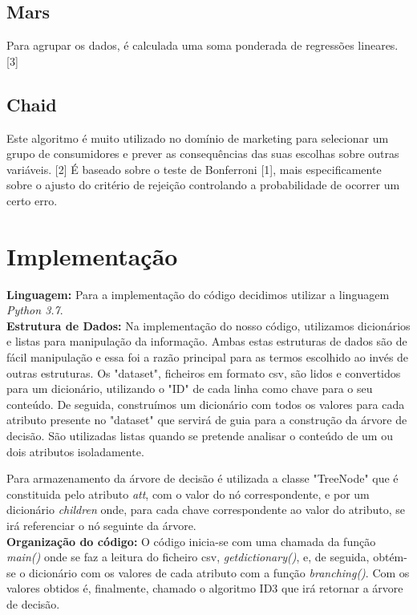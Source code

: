 \documentclass{article}
\begin{document}
\subsection{Mars}
\hspace{10mm}Para agrupar os dados, é calculada uma soma ponderada de regressões lineares. [3]
\subsection{Chaid}
\hspace{10mm}Este algoritmo é muito utilizado no domínio de marketing para selecionar um grupo de consumidores e prever as consequências das suas escolhas sobre outras variáveis. [2]
É baseado sobre o teste de Bonferroni [1], mais especificamente sobre o ajusto do critério de rejeição controlando a probabilidade de ocorrer um certo erro.
\newpage
\section{Implementação}
\textbf{Linguagem:} Para a implementação do código decidimos utilizar a linguagem \textit{Python 3.7}.\\[2mm]
\textbf{Estrutura de Dados:} Na implementação do nosso código, utilizamos dicionários e listas para manipulação da informação. Ambas estas estruturas de dados são de fácil manipulação e essa foi a razão principal para as termos escolhido ao invés de outras estruturas. Os "dataset", ficheiros em formato csv, são lidos e convertidos para um dicionário, utilizando o "ID" de cada linha como chave para o seu conteúdo. De seguida, construímos um dicionário com todos os valores para cada atributo presente no "dataset" que servirá de guia para a construção da árvore de decisão. São utilizadas listas quando se pretende analisar o conteúdo de um ou dois atributos isoladamente.

Para armazenamento da árvore de decisão é utilizada a classe "TreeNode" que é constituida pelo atributo \textit{att}, com o valor do nó correspondente, e por um dicionário \textit{children} onde, para cada chave correspondente ao valor do atributo, se irá referenciar o nó seguinte da árvore.\\[2mm]
\textbf{Organização do código:} O código inicia-se com uma chamada da função \textit{main()} onde se faz a leitura do ficheiro csv, \textit{get\textunderscore dictionary()}, e, de seguida, obtém-se o dicionário com os valores de cada atributo com a função \textit{branching()}. Com os valores obtidos é, finalmente, chamado o algoritmo ID3 que irá retornar a árvore de decisão.
\end{document}
